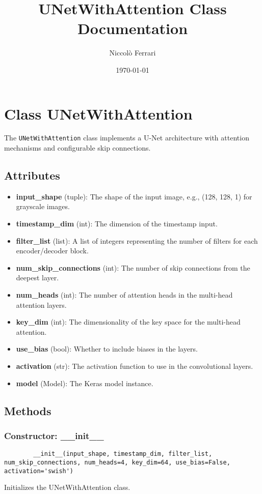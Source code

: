 \documentclass{article}
\title{UNetWithAttention Class Documentation}
\author{Niccolò Ferrari}
\date{\today}
\begin{document}
	
	\maketitle
	
	\section{Class UNetWithAttention}
	The \texttt{UNetWithAttention} class implements a U-Net architecture with attention mechanisms and configurable skip connections.
	
	\subsection*{Attributes}
	\begin{itemize}
		\item \textbf{input\_shape} (tuple): The shape of the input image, e.g., (128, 128, 1) for grayscale images.
		\item \textbf{timestamp\_dim} (int): The dimension of the timestamp input.
		\item \textbf{filter\_list} (list): A list of integers representing the number of filters for each encoder/decoder block.
		\item \textbf{num\_skip\_connections} (int): The number of skip connections from the deepest layer.
		\item \textbf{num\_heads} (int): The number of attention heads in the multi-head attention layers.
		\item \textbf{key\_dim} (int): The dimensionality of the key space for the multi-head attention.
		\item \textbf{use\_bias} (bool): Whether to include biases in the layers.
		\item \textbf{activation} (str): The activation function to use in the convolutional layers.
		\item \textbf{model} (Model): The Keras model instance.
	\end{itemize}
	
	\subsection*{Methods}
	\subsubsection*{Constructor: \_\_init\_\_}
	\begin{verbatim}
		__init__(input_shape, timestamp_dim, filter_list, num_skip_connections, num_heads=4, key_dim=64, use_bias=False, activation='swish')
	\end{verbatim}
	Initializes the UNetWithAttention class.
	
\end{document}
